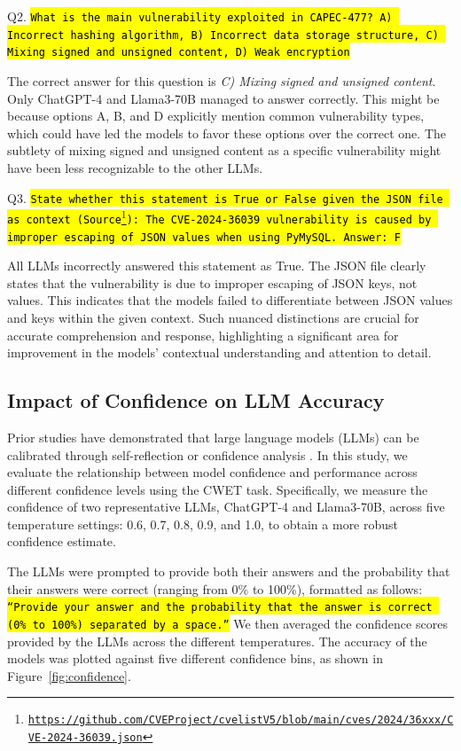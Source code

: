 \documentclass[conference]{IEEEtran}
\newcommand{\code}[1]{\sethlcolor{lightergray}\texttt{\small\hl{#1}}}
\begin{document}
Q2. \code{What is the main vulnerability exploited in CAPEC-477?	A) Incorrect hashing algorithm, B) Incorrect data storage structure, C) Mixing signed and unsigned content, D) Weak encryption}

The correct answer for this question is \textit{C) Mixing signed and unsigned content}. Only ChatGPT-4 and Llama3-70B managed to answer correctly. This might be because options A, B, and D explicitly mention common vulnerability types, which could have led the models to favor these options over the correct one. The subtlety of mixing signed and unsigned content as a specific vulnerability might have been less recognizable to the other LLMs.

Q3. \code{State whether this statement is True or False given the JSON file as context (Source\footnote{\url{https://github.com/CVEProject/cvelistV5/blob/main/cves/2024/36xxx/CVE-2024-36039.json}}): The CVE-2024-36039 vulnerability is caused by improper escaping of JSON values when using PyMySQL.	Answer: F}

All LLMs incorrectly answered this statement as True. The JSON file clearly states that the vulnerability is due to improper escaping of JSON keys, not values. This indicates that the models failed to differentiate between JSON values and keys within the given context. Such nuanced distinctions are crucial for accurate comprehension and response, highlighting a significant area for improvement in the models' contextual understanding and attention to detail.

\subsection{Impact of Confidence on LLM Accuracy}

Prior studies have demonstrated that large language models (LLMs) can be calibrated through self-reflection or confidence analysis \cite{chen2023quantifying}. In this study, we evaluate the relationship between model confidence and performance across different confidence levels using the CWET task. Specifically, we measure the confidence of two representative LLMs, ChatGPT-4 and Llama3-70B, across five temperature settings: 0.6, 0.7, 0.8, 0.9, and 1.0, to obtain a more robust confidence estimate.

The LLMs were prompted to provide both their answers and the probability that their answers were correct (ranging from 0\% to 100\%), formatted as follows: \code{``Provide your answer and the probability that the answer is correct (0\% to 100\%) separated by a space.''} We then averaged the confidence scores provided by the LLMs across the different temperatures. The accuracy of the models was plotted against five different confidence bins, as shown in Figure~\ref{fig:confidence}.
\end{document}
